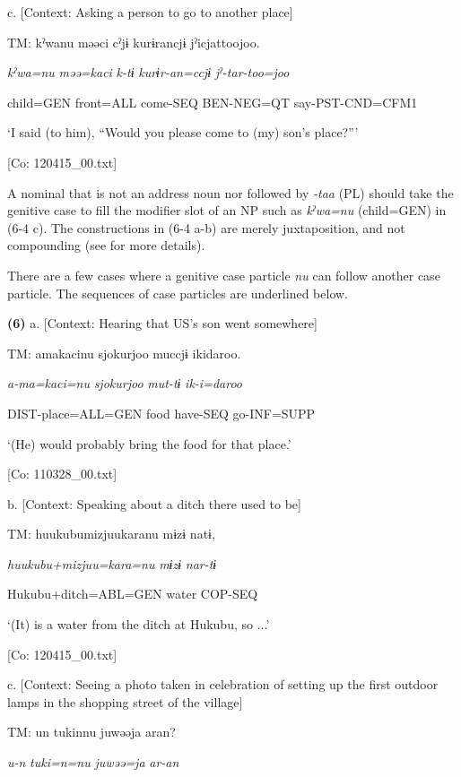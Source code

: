   c.  [Context: Asking a person to go to another place]

    TM:  kˀwanu  məəci  cˀjɨ  kurɨrancjɨ  jˀicjattoojoo.

      \textit{kˀwa=nu}  \textit{məə=kaci}  \textit{k-tɨ}  \textit{kurɨr-an=ccjɨ}  \textit{jˀ-tar-too=joo}

      child=GEN  front=ALL  come-SEQ  BEN-NEG=QT  say-PST-CND=CFM1

      ‘I said (to him), “Would you please come to (my) son’s place?”’

      [Co: 120415\_00.txt]

A nominal that is not an address noun nor followed by \textit{{}-taa} (PL) should take the genitive case to fill the modifier slot of an NP such as \textit{kˀwa=nu} (child=GEN) in (6-4 c). The constructions in (6-4 a-b) are merely juxtaposition, and not compounding (see  for more details).

  There are a few cases where a genitive case particle \textit{nu} can follow another case particle. The sequences of case particles are underlined below.

\textbf{(6)}  a.  [Context: Hearing that US’s son went somewhere]

    TM:  amakacinu  {\textbar}sjokurjoo{\textbar}  muccjɨ  ikidaroo.

      \textit{a-ma=kaci=nu}  \textit{sjokurjoo}  \textit{mut-tɨ}  \textit{ik-i=daroo}

      DIST-place=ALL=GEN  food  have-SEQ  go-INF=SUPP

      ‘(He) would probably bring the food for that place.’

      [Co: 110328\_00.txt]

  b.  [Context: Speaking about a ditch there used to be]

    TM:  huukubumizjuukaranu  mɨzɨ  natɨ,

      \textit{huukubu+mizjuu=kara=nu}  \textit{mɨzɨ}  \textit{nar-tɨ}

      Hukubu+ditch=ABL=GEN  water  COP-SEQ

      ‘(It) is a water from the ditch at Hukubu, so ...’

      [Co: 120415\_00.txt]

  c.  [Context: Seeing a photo taken in celebration of setting up the first outdoor lamps in the shopping street of the village]

    TM:  un  tukinnu  juwəəja  aran?

      \textit{u-n}  \textit{tuki=n=nu}  \textit{juwəə=ja}  \textit{ar-an}

